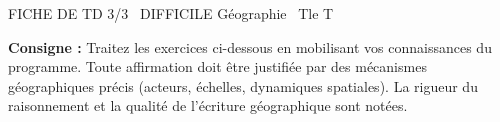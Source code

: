 \documentclass[11pt]{article}
\begin{document}
\begin{tcolorbox}[enhanced,colback=popink,colframe=popink,arc=10pt,boxrule=0pt,left=12pt,right=12pt,top=9pt,bottom=9pt]
{\color{white}\popxbold\small FICHE DE TD 3/3 \textbullet\ DIFFICILE \hfill Géographie \textbullet\ Tle T\par}
\end{tcolorbox}
\vspace{4pt}
\noindent \textbf{Consigne :} Traitez les exercices ci-dessous en mobilisant vos connaissances du programme. Toute affirmation doit être justifiée par des mécanismes géographiques précis (acteurs, échelles, dynamiques spatiales). La rigueur du raisonnement et la qualité de l'écriture géographique sont notées.
\end{document}
